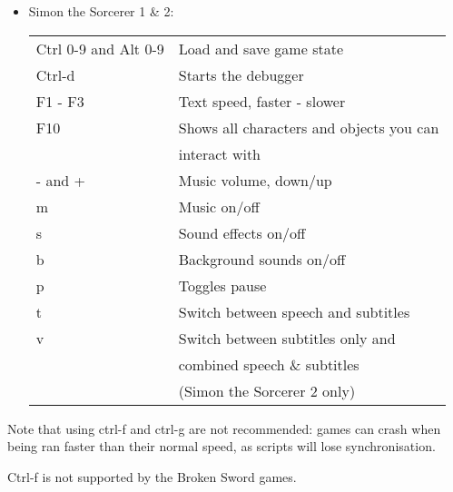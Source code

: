 \begin{itemize}
\item Simon the Sorcerer 1 \& 2:\\
  \begin{tabular}{ll}
    Ctrl 0-9 and Alt 0-9   & Load and save game state\\
    Ctrl-d                 & Starts the debugger\\
    F1 - F3                & Text speed, faster - slower\\
    F10                    & Shows all characters and objects you can \\
                           & interact with\\
    - and +                & Music volume, down/up\\
    m                      & Music on/off\\
    s                      & Sound effects on/off\\
    b                      & Background sounds on/off\\
    p                      & Toggles pause\\
    t                      & Switch between speech and subtitles\\
    v                      & Switch between subtitles only and\\
                           & combined speech \& subtitles\\
                           & (Simon the Sorcerer 2 only)\\
  \end{tabular}
\end{itemize}
Note that using ctrl-f and ctrl-g are not recommended: games can crash when
being ran faster than their normal speed, as scripts will lose synchronisation.

Ctrl-f is not supported by the Broken Sword games.
